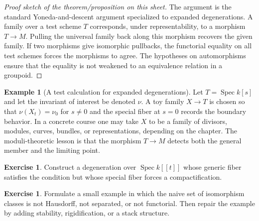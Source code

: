 \documentclass[11pt]{amsart}
\theoremstyle{definition}
\newtheorem{example}[theorem]{Example}
\newtheorem{exercise}[theorem]{Exercise}
\newcommand{\Spec}{\operatorname{Spec}}
\begin{document}
\begin{proof}[Proof sketch of the theorem/proposition on this sheet]
The argument is the standard Yoneda-and-descent argument specialized to expanded degenerations.  A family over a test scheme $T$ corresponds, under representability, to a morphism $T\to M$.  Pulling the universal family back along this morphism recovers the given family.  If two morphisms give isomorphic pullbacks, the functorial equality on all test schemes forces the morphisms to agree.  The hypotheses on automorphisms ensure that the equality is not weakened to an equivalence relation in a groupoid.
\end{proof}
\begin{example}[A test calculation for expanded degenerations]
Let $T=\Spec k[s]$ and let the invariant of interest be denoted $\nu$.  A toy family $X\to T$ is chosen so that $\nu(X_t)=\nu_0$ for $s\ne0$ and the special fiber at $s=0$ records the boundary behavior.  In a concrete course one may take $X$ to be a family of divisors, modules, curves, bundles, or representations, depending on the chapter.  The moduli-theoretic lesson is that the morphism $T\to M$ detects both the general member and the limiting point.
\end{example}
\begin{exercise}
Construct a degeneration over $\Spec k[[t]]$ whose generic fiber satisfies the condition but whose special fiber forces a compactification.
\end{exercise}
\begin{exercise}
Formulate a small example in which the naive set of isomorphism classes is not Hausdorff, not separated, or not functorial.  Then repair the example by adding stability, rigidification, or a stack structure.
\end{exercise}
\clearpage
\end{document}
